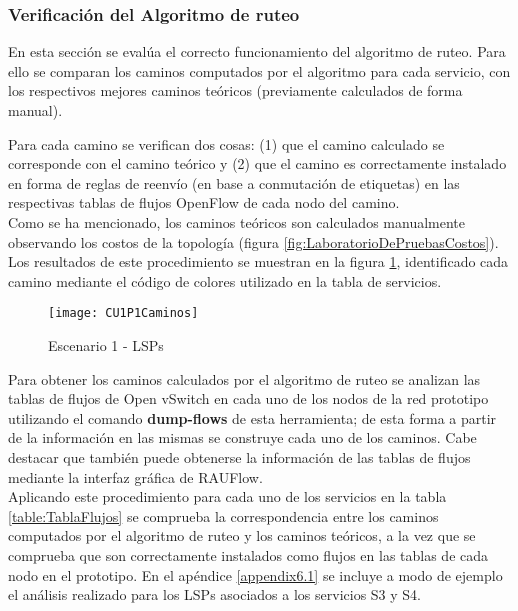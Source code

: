 

\subsubsection{Verificaci\'on del Algoritmo de ruteo}
En esta secci\'on se eval\'ua el correcto funcionamiento del algoritmo de ruteo. Para ello se comparan los caminos computados por el algoritmo para cada servicio, con los respectivos mejores caminos te\'oricos (previamente calculados de forma manual). 

Para cada camino se verifican dos cosas: (1) que el camino calculado se corresponde con el camino te\'orico y (2) que el camino es correctamente instalado en forma de reglas de reenvío (en base a conmutaci\'on de etiquetas) en las respectivas tablas de flujos OpenFlow de cada nodo del camino.\\

Como se ha mencionado, los caminos te\'oricos son calculados manualmente observando los costos de la topolog\'ia (figura \ref{fig:LaboratorioDePruebasCostos}). Los resultados de este procedimiento se muestran en la figura \ref{fig:CUP1Caminos}, identificado cada camino mediante el código de colores utilizado en la tabla de servicios.\\

\begin{figure}[ht!] 
\centering    
\texttt{[image: CU1P1Caminos]}
\caption[Escenario 1 - LSPs]{Escenario 1 - LSPs}
\label{fig:CUP1Caminos}
\end{figure}

Para obtener los caminos calculados por el algoritmo de ruteo se analizan las tablas de flujos de Open vSwitch en cada uno de los nodos de la red prototipo utilizando el comando \textbf{dump-flows} de esta herramienta; de esta forma a partir de la informaci\'on en las mismas se construye cada uno de los caminos. Cabe destacar que tambi\'en puede obtenerse la informaci\'on de las tablas de flujos mediante la interfaz gráfica de RAUFlow.\\

Aplicando este procedimiento para cada uno de los servicios en la tabla \ref{table:TablaFlujos} se comprueba la correspondencia entre los caminos computados por el algoritmo de ruteo y los caminos te\'oricos, a la vez que se comprueba que son correctamente instalados como flujos en las tablas de cada nodo en el prototipo. En el apéndice \ref{appendix6.1} se incluye a modo de ejemplo el análisis realizado para los LSPs asociados a los servicios S3 y S4.\\ 
 
